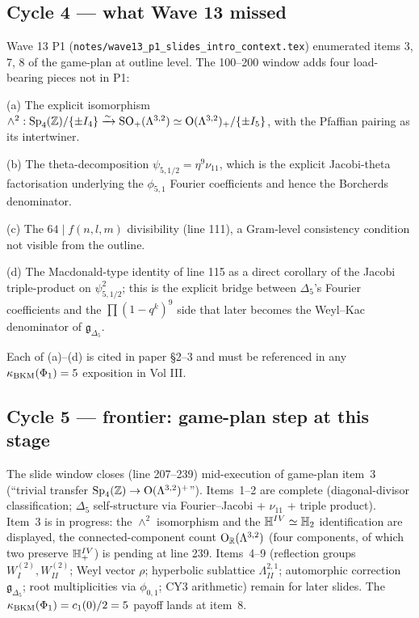 \subsection*{Cycle 4 --- what Wave 13 missed}

Wave 13 P1 (\texttt{notes/wave13\_p1\_slides\_intro\_context.tex})
enumerated items 3, 7, 8 of the game-plan at outline level. The 100--200
window adds four load-bearing pieces not in P1:

(a) The explicit isomorphism
$\wedge^2:\mathrm{Sp}_4(\mathbb{Z})/\{\pm I_4\}\xrightarrow{\sim}\mathrm{SO}_+(\Lambda^{3,2})
\simeq\mathrm{O}(\Lambda^{3,2})_+/\{\pm I_5\}$, with the Pfaffian pairing as
its intertwiner.

(b) The theta-decomposition $\psi_{5,1/2}=\eta^9\nu_{11}$, which is
the explicit Jacobi-theta factorisation underlying the $\phi_{5,1}$
Fourier coefficients and hence the Borcherds denominator.

(c) The $64\mid f(n,l,m)$ divisibility (line 111), a Gram-level
consistency condition not visible from the outline.

(d) The Macdonald-type identity of line 115 as a direct corollary of
the Jacobi triple-product on $\psi_{5,1/2}^2$; this is the explicit
bridge between $\Delta_5$'s Fourier coefficients and the $\prod(1-q^k)
^9$ side that later becomes the Weyl--Kac denominator of
$\mathfrak{g}_{\Delta_5}$.

Each of (a)--(d) is cited in paper \S 2--3 and must be referenced in
any $\kappa_{\mathrm{BKM}}(\Phi_1)=5$ exposition in Vol III.

\subsection*{Cycle 5 --- frontier: game-plan step at this stage}

The slide window closes (line 207--239) mid-execution of game-plan
item~3 (``trivial transfer $\mathrm{Sp}_4(\mathbb{Z})\to\mathrm{O}(\Lambda^{3,2})^+$'').
Items~1--2 are complete (diagonal-divisor classification; $\Delta_5$
self-structure via Fourier--Jacobi + $\nu_{11}$ + triple product).
Item~3 is in progress: the $\wedge^2$ isomorphism and the $\mathbb{H}^{IV}
\simeq\mathbb{H}_2$ identification are displayed, the connected-component
count $\mathrm{O}_{\mathbb{R}}(\Lambda^{3,2})$ (four components, of which
two preserve $\mathbb{H}^{IV}_+$) is pending at line 239. Items~4--9 (reflection
groups $W_I^{(2)}, W_{II}^{(2)}$; Weyl vector $\rho$; hyperbolic
sublattice $\Lambda^{2,1}_{II}$; automorphic correction
$\mathfrak{g}_{\Delta_5}$; root multiplicities via $\phi_{0,1}$; CY3
arithmetic) remain for later slides. The $\kappa_{\mathrm{BKM}}(\Phi_1)=c_1(0)/2=5$
payoff lands at item~8.
